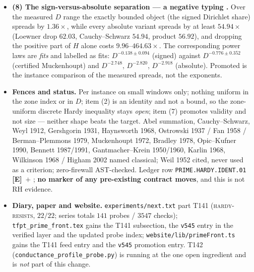 \documentclass[11pt]{article}
\providecommand{\mE}{\textbf{[E]}}\providecommand{\mC}{\textbf{[C]}}
\begin{document}
\begin{itemize}[leftmargin=1.5em]
Controls: the same $Y$ without its mass term is singular --- the constant vector lies in its kernel
($5.7\times10^{-17}$) while $H$ does not vanish there --- so the certificate \emph{refuses} on
$11/11$; and dropping the \emph{positive} part instead of the negative one falls below $\rho(W)$ on
$11/11$.
\item \textbf{(8) The sign-versus-absolute separation --- a negative typing \mX.} Over the measured
$D$ range the exactly bounded object (the signed Dirichlet share) spreads by $1.36\times$, while
every absolute variant spreads by at least $54.94\times$ (Loewner drop $62.03$, Cauchy--Schwarz
$54.94$, product $56.92$), and dropping the positive part of $H$ alone costs
$9.96$--$464.63\times$. The corresponding power laws are \emph{fits} and labelled as fits:
$D^{-0.138\pm0.094}$ (signed) against $D^{-0.776\pm0.352}$ (certified Muckenhoupt) and
$D^{-2.748}$, $D^{-2.820}$, $D^{-2.918}$ (absolute). Promoted is the instance comparison of the
measured spreads, not the exponents.
\item \textbf{Fences and status.} Per instance on small windows only; nothing uniform in the zone
index or in $D$; item (2) is an identity and not a bound, so the zone-uniform discrete Hardy
inequality stays \emph{open}; item (7) promotes validity and not size --- neither shape beats the
target. Abel summation, Cauchy--Schwarz, Weyl 1912, Gershgorin 1931, Haynsworth 1968, Ostrowski
1937 / Fan 1958 / Berman--Plemmons 1979, Muckenhoupt 1972, Bradley 1978, Opic--Kufner 1990, Bennett
1987/1991, Gantmacher--Krein 1950/1960, Karlin 1968, Wilkinson 1968 / Higham 2002 named classical;
Weil 1952 cited, never used as a criterion; zero-firewall AST-checked. Ledger row
\texttt{PRIME.HARDY.IDENT.01} \mE\ $+$ \mX; \textbf{no marker of any pre-existing contract moves},
and this is not RH evidence.
\item \textbf{Diary, paper and website.} \texttt{experiments/next.txt} part T141
(\textsc{hardy-resists}, $22/22$; series totals $141$ probes / $3547$ checks);
\texttt{tfpt\_prime\_front.tex} gains the T141 subsection, the \texttt{v545} entry in the verified
layer and the updated probe index; \texttt{website/lib/primeFront.ts} gains the T141 feed entry and
the \texttt{v545} promotion entry. T142 (\texttt{conductance\_profile\_probe.py}) is running at the
one open ingredient and is \emph{not} part of this change.
\end{itemize}
\end{document}
